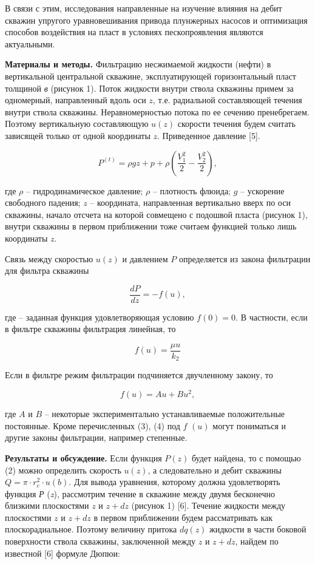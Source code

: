 \begin{multicols}{2}
В связи с этим, исследования направленные на изучение влияния на дебит
скважин упругого уравновешивания привода плунжерных насосов и
оптимизация способов воздействия на пласт в условиях пескопроявления
являются актуальными.

{\bfseries Материалы и методы.} Фильтрацию несжимаемой жидкости (нефти) в
вертикальной центральной скважине, эксплуатирующей горизонтальный пласт
толщиной \emph{в} (рисунок 1). Поток жидкости внутри ствола скважины
примем за одномерный, направленный вдоль оси $z$, т.е. радиальной
составляющей течения внутри ствола скважины. Неравномерностью потока по
ее сечению пренебрегаем. Поэтому вертикальную составляющую $u(z)$
скорости течения будем считать зависящей только от одной координаты
$z$. Приведенное давление {[}5{]}.

\begin{equation}
P^{(t)}=\rho gz+p+\rho\left(\frac{V_1^2}{2}-\frac{V_2^2}{2}\right),
\end{equation}

где $\rho$ -- гидродинамическое давление; $\rho$ -- плотность
флюида; $g$ -- ускорение свободного падения; $z$ --
координата, направленная вертикально вверх по оси скважины, начало
отсчета на которой совмещено с подошвой пласта (рисунок 1), внутри
скважины в первом приближении тоже считаем функцией только лишь
координаты $z$.

Связь между скоростью $u(z)$ и давлением $P$ определяется из
закона фильтрации для фильтра скважины

\begin{equation}
\frac{dP}{dz}=-f(u),
\end{equation}

где 
-- заданная функция удовлетворяющая условию $f(0)=0$. В частности,
если в фильтре скважины фильтрация линейная, то

\begin{equation}
f(u)=\frac{\mu u}{k_2}
\end{equation}

Если в фильтре режим фильтрации подчиняется двучленному закону, то

\begin{equation}
f(u)=Au+Bu^2,
\end{equation}

где $A$ и $B$ -- некоторые экспериментально устанавливаемые
положительные постоянные. Кроме перечисленных (3), (4) под $f$
$(u)$ могут пониматься и другие законы фильтрации, например
степенные.

{\bfseries Результаты и обсуждение.} Если функция $P(z)$ будет
найдена, то с помощью (2) можно определить скорость $u(z)$,
а следовательно и дебит скважины $Q=\pi\cdot r_c^2\cdot u(b)$. Для
вывода уравнения, которому должна удовлетворять функция \emph{Р}
(\emph{z}), рассмотрим течение в скважине между двумя бесконечно
близкими плоскостями $z$ и $z+dz$ (рисунок 1) {[}6{]}. Течение
жидкости между плоскостями $z$ и $z+dz$ в первом приближении
будем рассматривать как плоскорадиальное. Поэтому величину притока
$dq(z)$ жидкости в части боковой поверхности ствола
скважины, заключенной между $z$ и $z+dz$, найдем по
известной {[}6{]} формуле Дюпюи:


\end{multicols}
